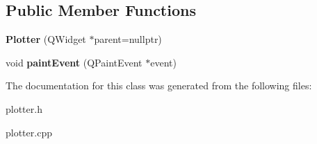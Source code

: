 \subsection*{Public Member Functions}
\begin{DoxyCompactItemize}
\item 
\mbox{\label{class_plotter_a1807627530de30ae58dff3c42a823497}} 
{\bfseries Plotter} (Q\+Widget $\ast$parent=nullptr)
\item 
\mbox{\label{class_plotter_a06477bf987646f000a8982db1352a11d}} 
void {\bfseries paint\+Event} (Q\+Paint\+Event $\ast$event)
\end{DoxyCompactItemize}


The documentation for this class was generated from the following files\+:\begin{DoxyCompactItemize}
\item 
plotter.\+h\item 
plotter.\+cpp\end{DoxyCompactItemize}
